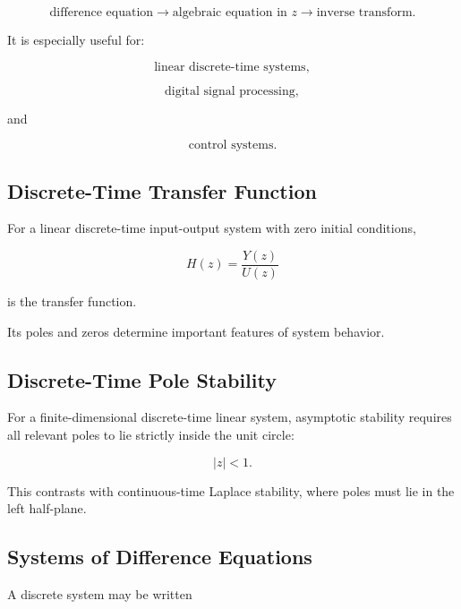 \[
\boxed{
\text{difference equation}
\longrightarrow
\text{algebraic equation in }z
\longrightarrow
\text{inverse transform}.
}
\]

It is especially useful for:

\[
\boxed{
\text{linear discrete-time systems},
}
\]

\[
\boxed{
\text{digital signal processing},
}
\]

and

\[
\boxed{
\text{control systems}.
}
\]

\subsection{Discrete-Time Transfer Function}
\label{subsec:discrete-time-transfer-function}

For a linear discrete-time input-output system with zero initial
conditions,

\[
\boxed{
H(z)
=
\frac{
Y(z)
}{
U(z)
}
}
\]

is the transfer function.

Its poles and zeros determine important features of system behavior.

\subsection{Discrete-Time Pole Stability}
\label{subsec:discrete-pole-stability}

For a finite-dimensional discrete-time linear system, asymptotic
stability requires all relevant poles to lie strictly inside the unit
circle:

\[
\boxed{
|z|<1.
}
\]

This contrasts with continuous-time Laplace stability, where poles must
lie in the left half-plane.

\subsection{Systems of Difference Equations}
\label{subsec:systems-of-difference-equations}

A discrete system may be written

